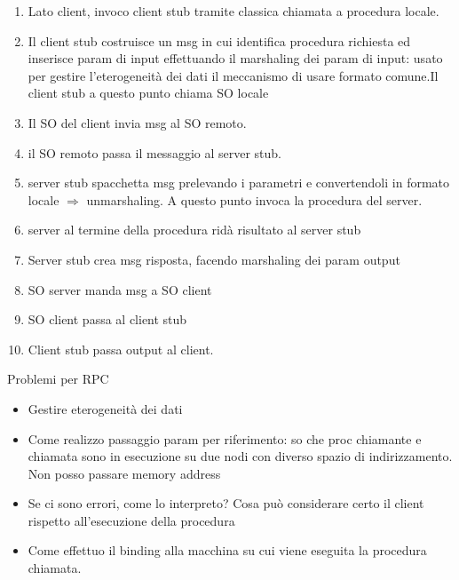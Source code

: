 \documentclass{article}
\begin{document}
\begin{enumerate}
\item Lato client, invoco client stub tramite classica chiamata a procedura locale.
\item Il client stub costruisce un msg in cui identifica procedura richiesta ed inserisce param di input effettuando il marshaling dei param di input: usato per gestire l'eterogeneità dei dati il meccanismo di usare formato comune.Il client stub a questo punto chiama SO locale
\item Il SO del client invia msg al SO remoto.
\item il SO remoto passa il messaggio al server stub.
\item server stub spacchetta msg prelevando i parametri e convertendoli in formato locale $\Rightarrow$ unmarshaling. A questo punto invoca la procedura del server.
\item server al termine della procedura ridà risultato al server stub
\item Server stub crea msg risposta, facendo marshaling dei param output
\item SO server manda msg a SO client
\item SO client passa al client stub
\item Client stub passa output al client.
\end{enumerate}
Problemi per RPC
\begin{itemize}
\item Gestire eterogeneità dei dati
\item Come realizzo passaggio param per riferimento: so che proc chiamante e chiamata sono in esecuzione su due nodi con diverso spazio di indirizzamento. Non posso passare memory address
\item Se ci sono errori, come lo interpreto? Cosa può considerare certo il client rispetto all'esecuzione della procedura
\item Come effettuo il binding alla macchina su cui viene eseguita la procedura chiamata.
\end{itemize}
\end{document}
